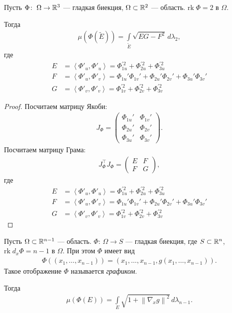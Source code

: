 \begin{exmpl}
 Пусть $\Phi \colon\; \Omega \to \mathbb{R}^{3}$ --- гладкая биекция, $\Omega \subset \mathbb{R}^{2}$ --- область. $\mathrm{rk}\; \Phi = 2$  в $\Omega$.

 Тогда
 \begin{align*}
  \mu(\Phi(\tilde E)) = \int\limits_{\tilde E} \sqrt{ EG - F^{2} } \, d\lambda_2
 ,\end{align*}  где \begin{align*}
 E &= \left\langle \Phi'_u, \Phi'_u \right\rangle  = \Phi_{1u}^{'2} + \Phi_{2u}^{'2} + \Phi_{3u}^{'2} \\
 F &= \left\langle \Phi'_u, \Phi'_v \right\rangle = \Phi_{1u}' \Phi_{1v}' + \Phi_{2u}' \Phi_{2v}' + \Phi_{3u}' \Phi_{3v}' \\
 G &= \left\langle \Phi'_v, \Phi'_v \right\rangle  = \Phi_{1v}^{'2} + \Phi_{2v}^{'2} + \Phi_{3v}^{'2}
\end{align*} 
\end{exmpl}
\begin{proof}
 Посчитаем матрицу Якоби:
 \begin{align*}
  J_{\Phi} = \begin{pmatrix}
   \Phi_{1u}' & \Phi_{1v}' \\
   \Phi_{2u}' & \Phi_{2v}' \\
   \Phi_{3u}' & \Phi_{3v}'
  \end{pmatrix}
 .\end{align*}  Посчитаем матрицу Грама:
 \begin{align*}
  J^{\top}_{\Phi} J_{\Phi} = \begin{pmatrix}
   E & F \\
   F & G
  \end{pmatrix}
 ,\end{align*}  где
 \begin{align*}
 E &= \left\langle \Phi'_u, \Phi'_u \right\rangle  = \Phi_{1u}^{'2} + \Phi_{2u}^{'2} + \Phi_{3u}^{'2} \\
 F &= \left\langle \Phi'_u, \Phi'_v \right\rangle = \Phi_{1u}' \Phi_{1v}' + \Phi_{2u}' \Phi_{2v}' + \Phi_{3u}' \Phi_{3v}' \\
 G &= \left\langle \Phi'_v, \Phi'_v \right\rangle  = \Phi_{1v}^{'2} + \Phi_{2v}^{'2} + \Phi_{3v}^{'2}
 \end{align*} 
\end{proof}

\begin{exmpl}
 Пусть $\Omega \subset \mathbb{R}^{n-1}$ --- область. $\Phi \colon\, \Omega \to S $  --- гладкая биекция, где $S \subset \mathbb{R}^{n}$, $\mathrm{rk}\; d_x \Phi = n - 1$ в $\Omega$. При этом $\Phi$ имеет вид
 \begin{align*}
  \Phi((x_1, \ldots, x_{n-1})) = (x_1, \ldots, x_{n-1}, g(x_1, \ldots, x_{n-1}))
 .\end{align*} Такое отображение $\Phi$ называется \textit{графиком}.

 Тогда
 \begin{align*}
  \mu(\Phi(E)) = \int\limits_{E} \sqrt{1 + \left\| \nabla_x g \right\|^{2}} \, d\lambda_{n-1}  
 .\end{align*} 
\end{exmpl}

